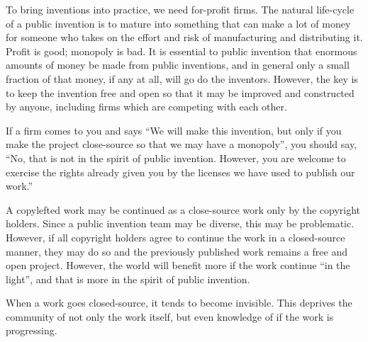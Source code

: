 \documentclass[
	fontsize=10pt, %
	twoside=false, %
	secnumdepth=1, %
]{kaobook}
\begin{document}
To bring inventions into practice, we need
for-profit firms. The natural life-cycle
of a public invention is to mature into
something that can make a lot of money
for someone who takes on the effort and
risk of manufacturing and distributing it.
Profit is good; monopoly is bad.
It is essential to public invention that
enormous amounts of money be made from public inventions,
and in general only a small fraction of that money,
if any at all, will go do the inventors.
However, the key is to keep the invention
free and open so that it may be improved
and constructed by anyone, including firms
which are competing with each other.

If a firm comes to you and says
``We will make this invention, but only
if you make the project close-source so
that we may have a monopoly'', you should
say, ``No, that is not in the spirit of public invention.
However, you are welcome to exercise the rights
already given you by the licenses we have used to
publish our work.''

A copylefted work may be continued as a
close-source work only by the copyright holders.
Since a public invention team may be diverse,
this may be problematic. However, if all copyright
holders agree to continue the work in a closed-source
manner, they may do so and the previously published
work remains a free and open project.
However, the world will benefit more if the
work continue ``in the light'', and that
is more in the spirit of public invention.

When a work goes closed-source, it tends
to become invisible.
This deprives the community of not
only the work itself, but even knowledge of if the work is
progressing.
\end{document}
